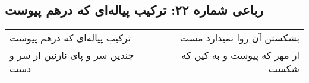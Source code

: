 \begin{center}
\section*{رباعی شماره ۲۲: ترکیب پیاله‌ای که درهم پیوست}
\label{sec:sh022}
\begin{longtable}{l p{0.5cm} r}
ترکیب پیاله‌ای که درهم پیوست
&&
بشکستن آن روا نمیدارد مست
\\
چندین سر و پای نازنین از سر و دست
&&
از مهر که پیوست و به کین که شکست
\\
\end{longtable}
\end{center}

